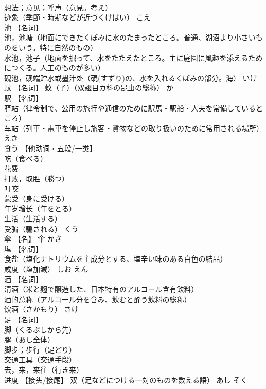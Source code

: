 \documentclass[8pt]{extreport}
\begin{document}
\begin{CJK}{UTF8}{min}
\\	想法；意见；呼声（意見。考え） 
\\	迹象（季節・時期などが近づくけはい）	こえ	
\\	池	【名词】 
\\	池，池塘（地面にできたくぼみに水のたまったところ。普通、湖沼より小さいものをいう。特に自然のもの） 
\\	水池，池子（地面を掘って、水をたたえたところ。主に庭園に風趣を添えるためにつくる。人工のものが多い） 
\\	砚池，砚端贮水或墨汁处（硯(すずり)の、水を入れるくぼみの部分。海）	いけ	
\\	蚊	【名词】 蚊（子）（双翅目カ科の昆虫の総称）	か	
\\	駅	【名词】 
\\	驿站（律令制で、公用の旅行や通信のために駅馬・駅船・人夫を常備しているところ） 
\\	车站（列車・電車を停止し旅客・貨物などの取り扱いのために常用される場所）	えき	
\\	食う	【他动词・五段/一类】 
\\	吃（食べる） 
\\	花费 
\\	打败，取胜（勝つ） 
\\	叮咬 
\\	蒙受（身に受ける） 
\\	年岁增长（年をとる） 
\\	生活（生活する） 
\\	受骗（騙される）	くう	
\\	傘	【名】 伞	かさ	
\\	塩	【名词】 
\\	食盐（塩化ナトリウムを主成分とする、塩辛い味のある白色の結晶） 
\\	咸度（塩加減）	しお えん	
\\	酒	【名词】 
\\	清酒（米と麹で醸造した、日本特有のアルコール含有飲料） 
\\	酒的总称（アルコール分を含み、飲むと酔う飲料の総称） 
\\	饮酒（さかもり）	さけ	
\\	足	【名词】 
\\	脚（くるぶしから先） 
\\	腿（あし全体） 
\\	脚步；步行（足どり） 
\\	交通工具（交通手段） 
\\	去，来，来往（行き来） 
\\	进度 【接头/接尾】 双（足などにつける一対のものを数える語）	あし そく	

\end{CJK}
\end{document}

